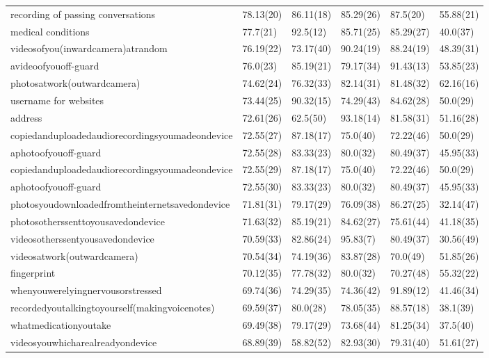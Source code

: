 \documentclass[a4paper,12pt]{article}
\begin{document}
\begin{longtable}{| p{7cm} | l | l | l | l | l |}
recording of passing conversations & 78.13(20) & 86.11(18) & 85.29(26) & 87.5(20) & 55.88(21) \\ 
medical conditions & 77.7(21) & 92.5(12) & 85.71(25) & 85.29(27) & 40.0(37) \\ 
videosofyou(inwardcamera)atrandom & 76.19(22) & 73.17(40) & 90.24(19) & 88.24(19) & 48.39(31) \\ 
avideoofyouoff-guard & 76.0(23) & 85.19(21) & 79.17(34) & 91.43(13) & 53.85(23) \\ 
photosatwork(outwardcamera) & 74.62(24) & 76.32(33) & 82.14(31) & 81.48(32) & 62.16(16) \\ 
username for websites & 73.44(25) & 90.32(15) & 74.29(43) & 84.62(28) & 50.0(29) \\ 
address & 72.61(26) & 62.5(50) & 93.18(14) & 81.58(31) & 51.16(28) \\ 
copiedanduploadedaudiorecordingsyoumadeondevice & 72.55(27) & 87.18(17) & 75.0(40) & 72.22(46) & 50.0(29) \\ 
aphotoofyouoff-guard & 72.55(28) & 83.33(23) & 80.0(32) & 80.49(37) & 45.95(33) \\ 
copiedanduploadedaudiorecordingsyoumadeondevice & 72.55(29) & 87.18(17) & 75.0(40) & 72.22(46) & 50.0(29) \\ 
aphotoofyouoff-guard & 72.55(30) & 83.33(23) & 80.0(32) & 80.49(37) & 45.95(33) \\ 
photosyoudownloadedfromtheinternetsavedondevice & 71.81(31) & 79.17(29) & 76.09(38) & 86.27(25) & 32.14(47) \\ 
photosotherssenttoyousavedondevice & 71.63(32) & 85.19(21) & 84.62(27) & 75.61(44) & 41.18(35) \\ 
videosotherssentyousavedondevice & 70.59(33) & 82.86(24) & 95.83(7) & 80.49(37) & 30.56(49) \\ 
videosatwork(outwardcamera) & 70.54(34) & 74.19(36) & 83.87(28) & 70.0(49) & 51.85(26) \\ 
fingerprint & 70.12(35) & 77.78(32) & 80.0(32) & 70.27(48) & 55.32(22) \\ 
whenyouwerelyingnervousorstressed & 69.74(36) & 74.29(35) & 74.36(42) & 91.89(12) & 41.46(34) \\ 
recordedyoutalkingtoyourself(makingvoicenotes) & 69.59(37) & 80.0(28) & 78.05(35) & 88.57(18) & 38.1(39) \\ 
whatmedicationyoutake & 69.49(38) & 79.17(29) & 73.68(44) & 81.25(34) & 37.5(40) \\ 
videosyouwhicharealreadyondevice & 68.89(39) & 58.82(52) & 82.93(30) & 79.31(40) & 51.61(27) \\ 

\end{longtable}
\end{document}
